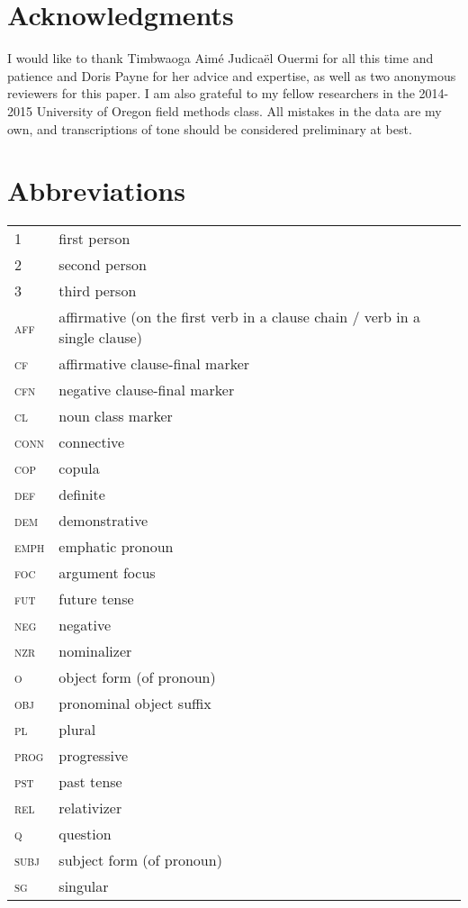 \documentclass[output=paper]{langsci/langscibook}
\begin{document}
\section*{\textbf{Acknowledgments}}

I would like to thank Timbwaoga Aim\'{e} Judica\"{e}l Ouermi for all this time and patience and Doris Payne for her advice and expertise, as well as two anonymous reviewers for this paper. I am also grateful to my fellow researchers in the 2014-2015 University of Oregon field methods class. All mistakes in the data are my own, and transcriptions of tone should be considered preliminary at best.

\section*{Abbreviations}

\begin{tabularx}{.45\textwidth}{lX}
1 &   first person   \\ 
2 & second person\\
3 & third person\\
\textsc{aff} & affirmative (on the first verb in a clause chain / verb in a single clause)\\
\textsc{cf} &  affirmative clause-final marker\\
\textsc{cfn} & negative clause-final marker\\
\textsc{cl} & noun class marker\\
\textsc{conn} & connective\\
\textsc{cop} & copula\\
\textsc{def} & definite\\
\textsc{dem} & demonstrative\\
\textsc{emph} & emphatic pronoun\\
\textsc{foc} & argument focus\\
\textsc{fut} & future tense\\
\textsc{neg} & negative\\
\textsc{nzr} & nominalizer\\
\textsc{o} & object form (of pronoun)\\
\textsc{obj} & pronominal object suffix\\
\textsc{pl} & plural\\
\textsc{prog} & progressive\\
\textsc{pst} & past tense\\
\textsc{rel} & relativizer\\
\textsc{q} & question\\
\textsc{subj} & subject form (of pronoun)\\
\textsc{sg} & singular\\
\end{tabularx}

\printbibliography[heading=subbibliography,notkeyword=this]
\end{document}
